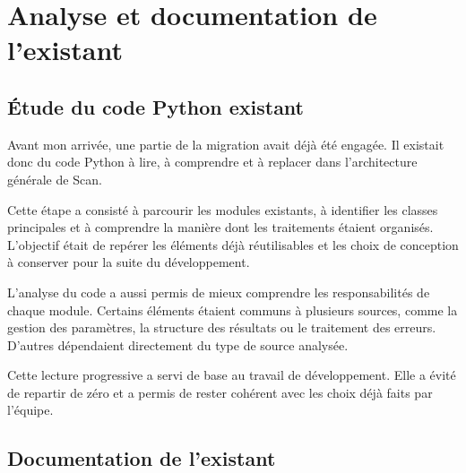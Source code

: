 
\section{Analyse et documentation de l'existant}
\label{sec:analyse_documentation_existant}


\subsection{Étude du code Python existant}
\label{subsec:etude_code_python_existant}

Avant mon arrivée, une partie de la migration avait déjà été engagée. Il
existait donc du code Python à lire, à comprendre et à replacer dans
l'architecture générale de Scan.

Cette étape a consisté à parcourir les modules existants, à identifier les
classes principales et à comprendre la manière dont les traitements étaient
organisés. L'objectif était de repérer les éléments déjà réutilisables et les choix de conception à conserver pour la suite
du développement.

L'analyse du code a aussi permis de mieux comprendre les responsabilités de
chaque module. Certains éléments étaient communs à plusieurs sources, comme la
gestion des paramètres, la structure des résultats ou le traitement des erreurs.
D'autres dépendaient directement du type de source analysée.

Cette lecture progressive a servi de base au travail de développement. Elle a
évité de repartir de zéro et a permis de rester cohérent avec les choix déjà
faits par l'équipe.


\subsection{Documentation de l'existant}
\label{subsec:documentation_existant}

